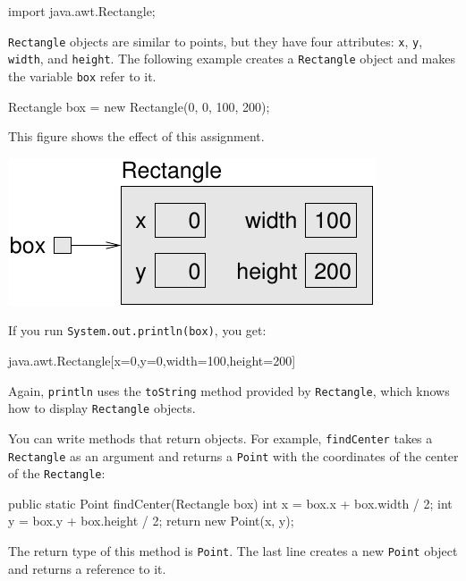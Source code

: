 \documentclass[12pt]{book}
\theoremstyle{exercise}
\newcommand{\java}[1]{\verb"#1"}
\newcommand{\java}[1]{\lstinline{#1}} %
\begin{document}
\begin{code}
import java.awt.Rectangle;
\end{code}

\java{Rectangle} objects are similar to points, but they have four attributes: \java{x}, \java{y}, \java{width}, and \java{height}.
The following example creates a \java{Rectangle} object and makes the variable \java{box} refer to it.

\begin{code}
    Rectangle box = new Rectangle(0, 0, 100, 200);
\end{code}

This figure shows the effect of this assignment.

\begin{center}
\includegraphics{figs/rectangle.pdf}
\end{center}

If you run \java{System.out.println(box)}, you get:

\begin{stdout}
java.awt.Rectangle[x=0,y=0,width=100,height=200]
\end{stdout}

Again, \java{println} uses the \java{toString} method provided by \java{Rectangle}, which knows how to display \java{Rectangle} objects.


You can write methods that return objects.
For example, \java{findCenter} takes a \java{Rectangle} as an argument and returns a \java{Point} with the coordinates of the center of the \java{Rectangle}:

\begin{code}
    public static Point findCenter(Rectangle box) {
        int x = box.x + box.width / 2;
        int y = box.y + box.height / 2;
        return new Point(x, y);
    }
\end{code}

The return type of this method is \java{Point}.
The last line creates a new \java{Point} object and returns a reference to it.
\end{document}
